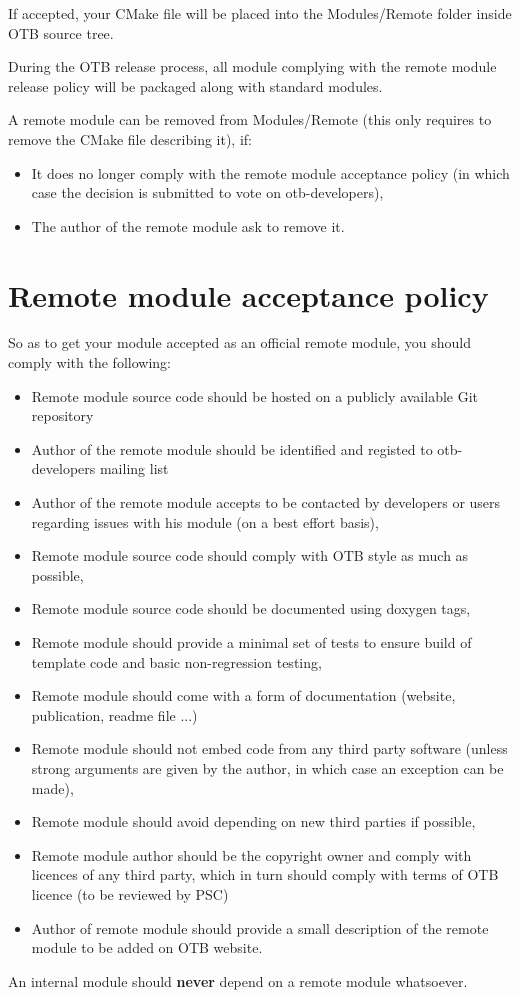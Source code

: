 If accepted, your CMake file will be placed into the Modules/Remote folder inside OTB source tree.

During the OTB release process, all module complying with the remote module release policy will be packaged along with standard modules.

A remote module can be removed from Modules/Remote (this only requires to remove the CMake file describing it), if: 

\begin{itemize}
       \item  It does no longer comply with the remote module acceptance policy (in which case the decision is submitted to vote on otb-developers), 
       \item  The author of the remote module ask to remove it. 
\end{itemize}

\section{Remote module acceptance policy }

So as to get your module accepted as an official remote module, you should comply with the following:
\begin{itemize}
	\item Remote module source code should be hosted on a publicly available Git repository
	\item Author of the remote module should be identified and registed to otb-developers mailing list
	\item Author of the remote module accepts to be contacted by developers or users regarding issues with his module (on a best effort basis),
	\item Remote module source code should comply with OTB style as much as possible,
	\item Remote module source code should be documented using doxygen tags,
	\item Remote module should provide a minimal set of tests to ensure build of template code and basic non-regression testing,
	\item Remote module should come with a form of documentation (website, publication, readme file ...)
	\item Remote module should not embed code from any third party software (unless strong arguments are given by the author, in which case an exception can be made),
	\item Remote module should avoid depending on new third parties if possible,
	\item Remote module author should be the copyright owner and comply with licences of any third party, which in turn should comply with terms of OTB licence (to be reviewed by PSC)
	\item Author of remote module should provide a small description of the remote module to be added on OTB website. 
\end{itemize}
An internal module should \textbf{never} depend on a remote module whatsoever. 

